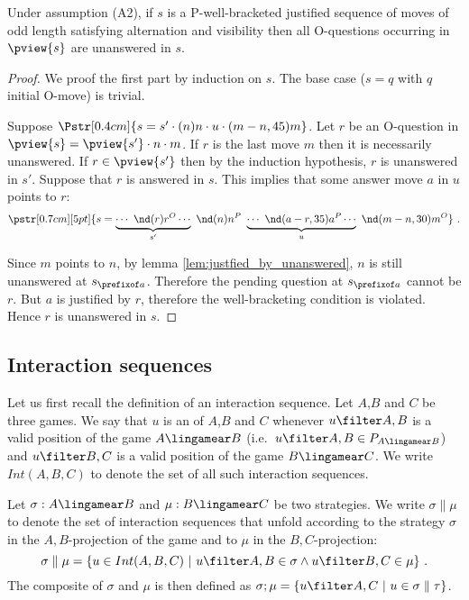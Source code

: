 \begin{lemma}
\label{lem:oq_in_pview_unanswered}
Under assumption (A2), if $s$ is a P-well-bracketed justified sequence of moves of odd length satisfying alternation and visibility then  all O-questions occurring in $\pview{s}$ are unanswered in $s$.
\end{lemma}
\begin{proof}
We proof the first part by induction on $s$.
The base case ($s = q$ with $q$ initial O-move) is trivial.

Suppose $\Pstr[0.4cm]{ s = s' \cdot (n)n \cdot u \cdot (m-n,45){m} }$.
Let $r$ be an O-question in $\pview{s} = \pview{s'} \cdot n \cdot m$.
If $r$ is the last move $m$ then it is necessarily unanswered.
If $r \in \pview{s'}$ then by the induction hypothesis, $r$ is unanswered in $s'$.
Suppose that $r$ is answered in $s$. This implies that some answer move $a$ in $u$ points to $r$:
$$\pstr[0.7cm][5pt]{ s = \underbrace{\cdots\ \nd(r){r}^O \cdots }_{s'} \
\nd(n){n}^P \ \underbrace{\cdots\ \nd(a-r,35){a}^P \cdots }_{u} \
\nd(m-n,30){m}^O } \ .$$

Since $m$ points to $n$, by lemma \ref{lem:justfied_by_unanswered}, $n$ is still unanswered at $s_{\prefixof a}$. Therefore the pending
question at $s_{\prefixof a}$ cannot be $r$. But $a$ is justified by $r$, therefore the well-bracketing condition is violated. Hence $r$ is
unanswered in $s$.
\end{proof}








\subsection{Interaction sequences} Let us first recall the
definition of an interaction sequence. Let $A$,$B$ and $C$ be three
games. We say that $u$  is an
\defname{interaction sequence} of $A$,$B$ and $C$ whenever $u\filter
A,B$ is a valid position of the game $A\lingamear B$ (i.e.~$u\filter
A,B \in P_{A\lingamear B}$) and  $u\filter B,C$ is a valid position
of the game $B\lingamear C$. We write $Int(A,B,C)$ to denote the set
of all such interaction sequences.

Let $\sigma:A\lingamear B$ and $\mu:B\lingamear C$ be two
strategies. We write $\sigma \parallel \mu$ to denote the set of
interaction sequences that unfold according to the strategy $\sigma$
in the $A,B$-projection of the game and to $\mu$ in the
$B,C$-projection:
$$ \sigma \parallel \mu = \{ u \in Int(A,B,C) \ | \ u\filter A,B \in \sigma \wedge u \filter B,C \in \mu \} \ .$$
The composite of $\sigma$ and $\mu$ is then defined as $\sigma ; \mu
= \{ u \filter A,C \ | \ u \in \sigma \parallel \tau \}$.

